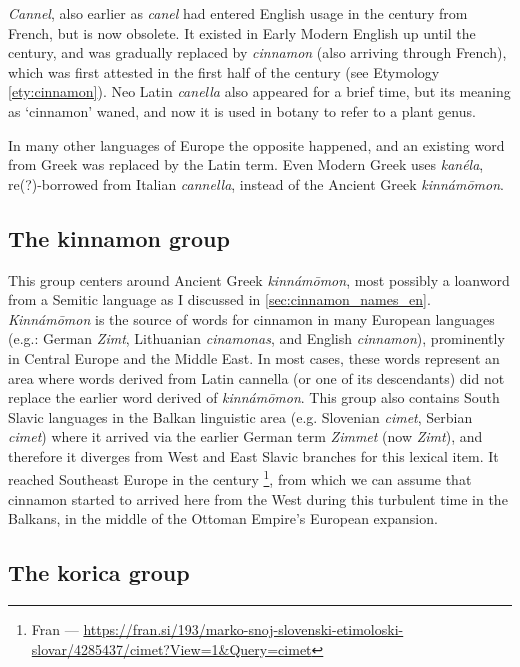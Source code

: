 \textit{\obs Cannel}, also earlier as \textit{canel} had entered English usage in the  century from French, but is now obsolete. It existed in Early Modern English up until the  century, and was gradually replaced by \textit{cinnamon} (also arriving through French), which was first attested in the first half of the  century (see Etymology \ref{ety:cinnamon}). Neo Latin \textit{canella} also appeared for a brief time, but its meaning as `cinnamon' waned, and now it is used in botany to refer to a plant genus.

In many other languages of Europe the opposite happened, and an existing word from Greek was replaced by the Latin term. Even Modern Greek uses \textit{kanéla}, re(?)-borrowed from Italian \textit{cannella}, instead of the Ancient Greek \textit{kinnámōmon}. 

\subsection{The kinnamon group}

This group centers around Ancient Greek \textit{kinnámōmon}, most possibly a loanword from a Semitic language as I discussed in \cref{sec:cinnamon_names_en}. \textit{Kinnámōmon} is the source of words for cinnamon in many European languages (e.g.: German \textit{Zimt}, Lithuanian \textit{cinamonas}, and English \textit{cinnamon}), prominently in Central Europe and the Middle East. In most cases, these words represent an area where words derived from Latin cannella (or one of its descendants) did not replace the earlier word derived of \textit{kinnámōmon}. This group also contains South Slavic languages in the Balkan linguistic area (e.g. Slovenian \textit{cimet}, Serbian  \textit{cimet}) where it arrived via the earlier German term \textit{Zimmet} (now \textit{Zimt}), and therefore it diverges from West and East Slavic branches for this lexical item. It reached Southeast Europe in the  century \parencite[s.v. cimet]{snoj_slovenski_1997}\footnote{Fran --- \url{https://fran.si/193/marko-snoj-slovenski-etimoloski-slovar/4285437/cimet?View=1\&Query=cimet}}, from which we can assume that cinnamon started to arrived here from the West during this turbulent time in the Balkans, in the middle of the Ottoman Empire's European expansion.

\subsection{The korica group}

